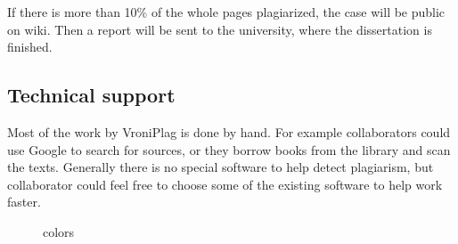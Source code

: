 If there is more than 10\% of the whole pages plagiarized, the case will be public on wiki. Then a report will be sent 
to the university, where the dissertation is finished.

\subsection{Technical support}

Most of the work by VroniPlag is done by hand. For example collaborators could use Google to search for sources, 
or they borrow books from the library and scan the texts. Generally there is no special software to help detect 
plagiarism, but collaborator could feel free to choose some of the existing software to help work faster.


	 \begin{figure}[!h]
  \centering
  \caption{colors}
  \label{fig:colors}
\end{figure}

	
